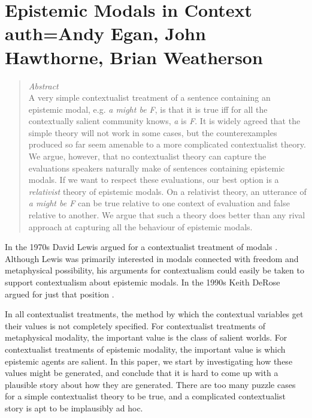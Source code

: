  
 
 
% 
% 
% 
% 
% 
% 
% 
% 
% 
% 
\chapter[Epistemic Modals in Context]{Epistemic Modals in Context auth=Andy Egan, John Hawthorne, Brian Weatherson} 

 
 
\begin{quote} \textit{Abstract} \\ \noindent A very simple contextualist treatment of a sentence containing an epistemic modal, e.g. \textit{a might be F}, is that it is true iff for all the contextually salient community knows, \textit{a} is \textit{F}. It is widely agreed that the simple theory will not work in some cases, but the counterexamples produced so far seem amenable to a more complicated contextualist theory. We argue, however, that no contextualist theory can capture the evaluations speakers naturally make of sentences containing epistemic modals. If we want to respect these evaluations, our best option is a \textit{relativist} theory of epistemic modals. On a relativist theory, an utterance of \textit{a might be F} can be true relative to one context of evaluation and false relative to another. We argue that such a theory does better than any rival approach at capturing all the behaviour of epistemic modals. 
\end{quote} 

 
In the 1970s David Lewis argued for a contextualist treatment of modals \citep{Lewis1976d, Lewis1979f}. Although Lewis was primarily interested in modals connected with freedom and metaphysical possibility, his arguments for contextualism could easily be taken to support contextualism about epistemic modals. In the 1990s Keith DeRose argued for just that position \citep{DeRose1991, DeRose1998}.
 
In all contextualist treatments, the method by which the contextual variables get their values is not completely specified. For contextualist treatments of metaphysical modality, the important value is the class of salient worlds. For contextualist treatments of epistemic modality, the important value is which epistemic agents are salient. In this paper, we start by investigating how these values might be generated, and conclude that it is hard to come up with a plausible story about how they are generated. There are too many puzzle cases for a simple contextualist theory to be true, and a complicated contextualist story is apt to be implausibly ad hoc.
 
